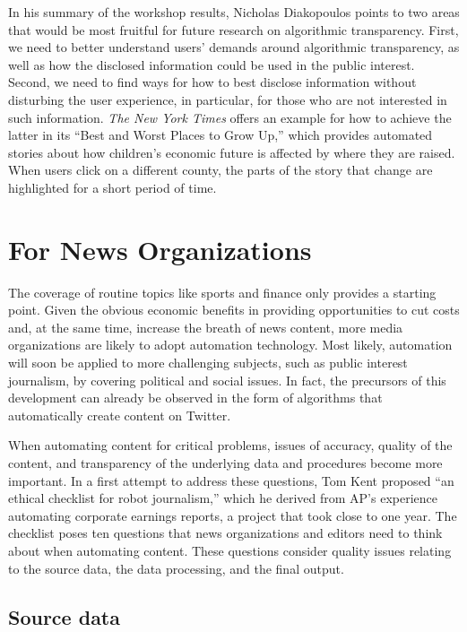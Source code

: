\documentclass[notoc, symmetric, nobib, nols]{towcenter-guideto-book}
\begin{document}
In his summary of the workshop results, Nicholas Diakopoulos points to two areas that would be most fruitful for future research on algorithmic transparency.\autocite{diak15} First, we need to better understand users' demands around algorithmic transparency, as well as how the disclosed information could be used in the public interest. Second, we need to find ways for how to best disclose information without disturbing the user experience, in particular, for those who are not interested in such information. \textit{The New York Times} offers an example for how to achieve the latter in its ``Best and Worst Places to Grow Up,'' which provides automated stories about how children's economic future is affected by where they are raised.\autocite{leon15} When users click on a different county, the parts of the story that change are highlighted for a short period of time.

\section{For News Organizations}

The coverage of routine topics like sports and finance only provides a starting point. Given the obvious economic benefits in providing opportunities to cut costs and, at the same time, increase the breath of news content, more media organizations are likely to adopt automation technology. Most likely, automation will soon be applied to more challenging subjects, such as public interest journalism, by covering political and social issues. In fact, the precursors of this development can already be observed in the form of algorithms that automatically create content on Twitter.\autocite{lokot15} 

When automating content for critical problems, issues of accuracy, quality of the content, and transparency of the underlying data and procedures become more important. In a first attempt to address these questions, Tom Kent proposed ``an ethical checklist for robot journalism,'' which he derived from AP's experience automating corporate earnings reports, a project that took close to one year. The checklist poses ten questions that news organizations and editors need to think about when automating content.\autocite{kent15} These questions consider quality issues relating to the source data, the data processing, and the final output.

\subsection{Source data}
\end{document}
